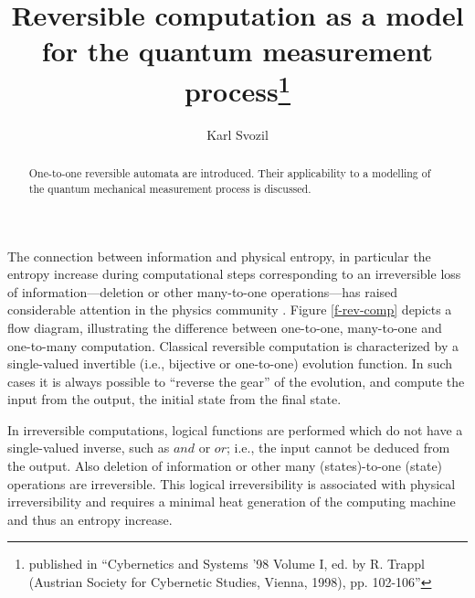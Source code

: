 \documentclass[pra,amsfonts,twocolumn]{revtex4}
\begin{document}
\title{Reversible computation as a model for the quantum measurement process\footnote{published in ``Cybernetics and Systems '98 Volume I, ed. by R. Trappl (Austrian Society for Cybernetic Studies, Vienna, 1998), pp. 102-106''}}
\author{Karl Svozil}


\begin{abstract}
One-to-one reversible automata are introduced. Their applicability to a modelling of the quantum mechanical measurement process is discussed.
\end{abstract}

\maketitle

The connection between information and physical entropy, in particular
the entropy increase during computational steps corresponding to an
irreversible loss of information---deletion or other many-to-one
operations---has raised considerable attention in the physics community
\cite{maxwell-demon}.
Figure \ref{f-rev-comp}  \cite{landauer-94} depicts a flow diagram,
illustrating the
difference between one-to-one, many-to-one and one-to-many computation.
Classical
reversible computation
\cite{landauer:61,bennett-73,fred-tof-82,bennett-82,landauer-94}
is characterized by a single-valued invertible (i.e., bijective or
one-to-one) evolution function.
In such cases
it is always possible to ``reverse the gear'' of the evolution, and
compute the input from the output, the initial state from the final
state.

In irreversible computations, logical functions
are performed which
do not have a single-valued inverse, such as ${and}$ or ${or}$;
i.e., the input cannot be deduced from the output. Also deletion of
information or other many
(states)-to-one
(state) operations are irreversible.
This logical irreversibility is associated with physical irreversibility
and requires a minimal heat generation of the computing machine and
thus an entropy increase.
\end{document}
